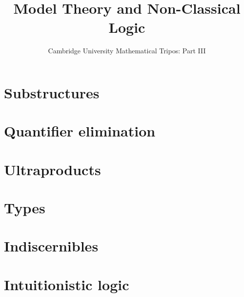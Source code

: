 \documentclass{article}
\title{Model Theory and Non-Classical Logic}
\author{Cambridge University Mathematical Tripos: Part III}
\begin{document}
\maketitle

\tableofcontentsnewpage{}

\section{Substructures}

\section{Quantifier elimination}

\section{Ultraproducts}

\section{Types}

\section{Indiscernibles}

\section{Intuitionistic logic}

\end{document}
